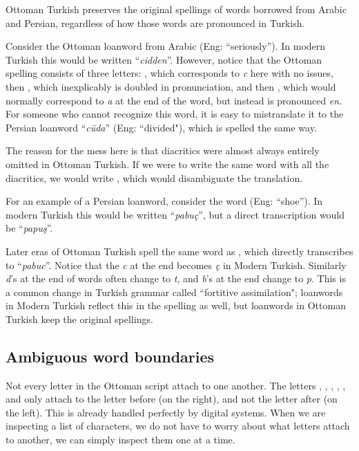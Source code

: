 \documentclass[10pt,twocolumn]{article}
\theoremstyle{nonumberplain}
\newcommand{\otto}[1]{\RLE{\ottoman{}\Large{}#1}}
\newcommand{\word}[1]{``\emph{#1}''}
\begin{document}
Ottoman Turkish preserves the original spellings of words borrowed from
Arabic and Persian, regardless of how those words are pronounced in Turkish.

Consider the Ottoman loanword from Arabic \otto{جدا} (Eng: ``seriously''). In
modern Turkish this would be written \word{cidden}. However, notice that the
Ottoman spelling consists of three letters: \otto{ج}, which corresponds to
\emph{c} here with no issues, then \otto{د}, which inexplicably is doubled in
pronunciation, and then \otto{ا}, which would normally correspond to
\emph{a} at the end of the word, but instead is pronounced \emph{en}.
For someone who cannot recognize this word, it is easy to mistranslate it to
the Persian loanword \word{cüda} (Eng: ``divided"), which is spelled the same way.

The reason for the mess here is that diacritics were almost always entirely omitted in Ottoman Turkish.
If we were to write the same word with all the diacritics, we would write
\otto{جِدَّاً}, which would disambiguate the translation.

For an example of a Persian loanword, consider the word \otto{پاپوش} (Eng: ``shoe'').
In modern Turkish this would be written \word{pabuç}, but a direct
transcription would be \word{papuş}.

Later eras of Ottoman Turkish spell the same word as \otto{پابوج}, which
directly transcribes to \word{pabuc}. Notice that the \emph{c} at the end becomes
\emph{ç} in Modern Turkish. Similarly \emph{d}'s at the end of words
often change to \emph{t}, and \emph{b}'s at the end change to \emph{p}.
This is a common change in Turkish grammar called
``fortitive assimilation"; loanwords in Modern Turkish reflect this in the
spelling as well, but loanwords in Ottoman Turkish keep the original spellings.

\subsection{Ambiguous word boundaries}

Not every letter in the Ottoman script attach to one another.
The letters \otto{ا}, \otto{د}, \otto{ذ}, \otto{ر}, \otto{ز}, \otto{ژ} and \otto{و}
only attach to the letter before (on the right), and not the letter after (on the left).
This is already handled perfectly by digital systems. When we are inspecting a
list of characters, we do not have to worry about what letters attach to
another, we can simply inspect them one at a time.
\end{document}

